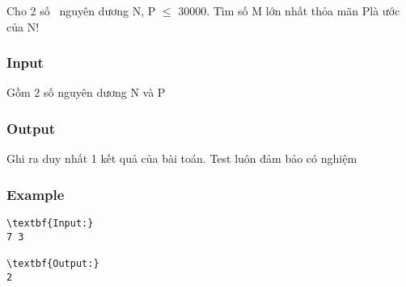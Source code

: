 



   Cho 2 số  nguyên dương N, P  $\le$  30000. Tìm số M lớn nhất thỏa mãn P\textasciicircumM là ước của N!  

\subsubsection{   Input  }

   Gồm 2 số nguyên dương N và P  

\subsubsection{   Output  }

   Ghi ra duy nhất 1 kết quả của bài toán. Test luôn đảm bảo có nghiệm  

\subsubsection{   Example  }
\begin{verbatim}
\textbf{Input:}
7 3

\textbf{Output:}
2\end{verbatim}
